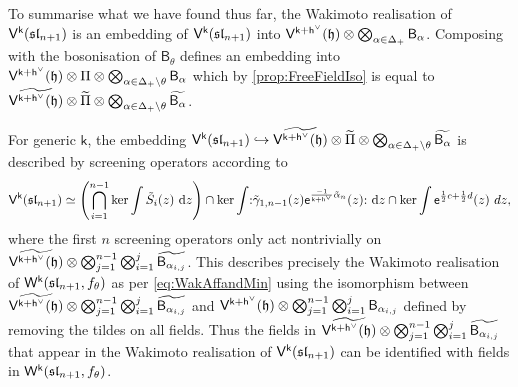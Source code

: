 \documentclass[10pt,a4paper]{amsart}
\numberwithin{equation}{section}
\renewcommand{\cong}{\simeq} %
\newcommand{\dd}{\mathrm{d}}   %
\newcommand{\ee}{\mathsf{e}}   %
\newcommand{\kk}{\mathsf{k}}   %
\DeclarePairedDelimiter{\brac}{\lparen}{\rparen}   %
\newcommand{\no}[1]{\mathopen{:} #1 \mathclose{:}} %
\newcommand{\alg}[1]{\mathfrak{#1}}  %
\newcommand{\VOA}[1]{\mathsf{#1}}    %
\newcommand{\SLA}[2]{\alg{#1}_{#2}}                      %
\newcommand{\slnpone}{\SLA{sl}{n+1}}
\newcommand{\cartan}{\mathfrak{h}}
\newcommand{\cox}{\mathsf{h}}                                        %
\newcommand{\dcox}{\coroot{\cox}}                                    %
\newcommand{\proots}{\Delta_+}                                       %
\newcommand{\sroot}[1]{\alpha_{#1}}                                  %
\newcommand{\tsroot}[1]{\tilde{\alpha}_{#1}}                         %
\newcommand{\hroot}{\theta}                                          %
\newcommand{\coroot}[1]{#1^{\vee}}                                   %
\newcommand{\fmin}{f_\theta}                                        %
\newcommand{\Wsymb}{\VOA{W}}
\newcommand{\uaffvoa}[2]{\VOA{V}^{#1}\brac{#2}}                   %
\newcommand{\bgvoa}{\VOA{B}}                                      %
\newcommand{\uQHR}[3]{\Wsymb^{#1}\brac{#2,#3}}                    %
\theoremstyle{plain}
\begin{document}
To summarise what we have found thus far, the Wakimoto realisation of $\uaffvoa{\kk}{\slnpone}$ is an embedding of $\uaffvoa{\kk}{\slnpone}$ into $\uaffvoa{\kk+\dcox}{\cartan} \otimes \bigotimes_{\alpha \in \proots} \bgvoa_\alpha$. Composing with the bosonisation of $\bgvoa_\theta$ defines an embedding into $\uaffvoa{\kk+\dcox}{\cartan} \otimes \Pi \otimes \bigotimes_{\alpha \in \proots \setminus \theta} \bgvoa_\alpha$ which by \cref{prop:FreeFieldIso} is equal to $\widetilde{\uaffvoa{\kk+\dcox}{\cartan}} \otimes \widetilde{\Pi} \otimes \bigotimes_{\alpha \in \proots \setminus \hroot} \widetilde{\bgvoa_\alpha}$. 

For generic $\kk$, the embedding $\uaffvoa{\kk}{\slnpone} \hookrightarrow \widetilde{\uaffvoa{\kk+\dcox}{\cartan}} \otimes \widetilde{\Pi} \otimes \bigotimes_{\alpha \in \proots \setminus \hroot} \widetilde{\bgvoa_\alpha}$ is described by screening operators according to
%
\begin{equation}
     \uaffvoa{\kk}{\slnpone} \cong \left( \bigcap_{i=1}^{n-1} \textup{ker} \int \tilde{S}_i(z) \ \dd z \right) \cap \textup{ker} \int \no{\tilde{\gamma}_{1,n-1}(z) \ee^{\frac{-1}{\kk+\dcox} \tsroot{n}}(z)} \ \dd z \cap  \textup{ker} \int \ee^{\frac{1}{2}c + \frac{1}{2}d}(z) \ dz,
\end{equation}
%
where the first $n$ screening operators only act nontrivially on $\widetilde{\uaffvoa{\kk+\dcox}{\cartan}} \otimes\bigotimes_{j=1}^{n-1}\bigotimes_{i=1}^{j} \widetilde{\bgvoa_{\sroot{i,j}}}$. This describes precisely the Wakimoto realisation of $\uQHR{\kk}{\slnpone}{\fmin}$ as per \eqref{eq:WakAffandMin} using the isomorphism between $\widetilde{\uaffvoa{\kk+\dcox}{\cartan}} \otimes \bigotimes_{j=1}^{n-1}\bigotimes_{i=1}^{j} \widetilde{\bgvoa_{\sroot{i,j}}}$ and $\uaffvoa{\kk+\dcox}{\cartan} \otimes \bigotimes_{j=1}^{n-1}\bigotimes_{i=1}^{j} \bgvoa_{\sroot{i,j}}$ defined by removing the tildes on all fields. Thus the fields in $\widetilde{\uaffvoa{\kk+\dcox}{\cartan}} \otimes \bigotimes_{j=1}^{n-1}\bigotimes_{i=1}^{j} \widetilde{\bgvoa_{\sroot{i,j}}}$ that appear in the Wakimoto realisation of $\uaffvoa{\kk}{\slnpone}$ can be identified with fields in $\uQHR{\kk}{\slnpone}{\fmin}$. 
\end{document}
